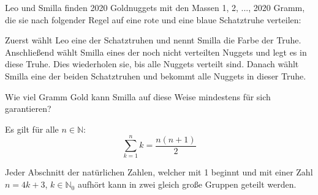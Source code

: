 \documentclass[10pt, a4paper]{amsart}
\begin{document}
\thispagestyle{fancy}
\begin{aufgabe}
  Leo und Smilla finden 2020 Goldnuggets mit den Massen 1, 2, ..., 2020 Gramm,
  die sie nach folgender Regel auf eine rote und eine blaue Schatztruhe
  verteilen:
  
  Zuerst wählt Leo eine der Schatztruhen und nennt Smilla die Farbe der Truhe.
  Anschließend wählt Smilla eines der noch nicht verteilten Nuggets und legt es
  in diese Truhe. Dies wiederholen sie, bis alle Nuggets verteilt sind. Danach
  wählt Smilla eine der beiden Schatztruhen und bekommt alle Nuggets in dieser
  Truhe.

  Wie viel Gramm Gold kann Smilla auf diese Weise mindestens für sich
  garantieren?
\end{aufgabe}
\begin{lemma}\label{sec1:Zahlensumme}
  Es gilt für alle $n\in\mathbb{N}$:
  \[ \sum^{n}_{k=1}k=\dfrac{n(n+1)}{2}\]
\end{lemma}
\begin{lemma}
  \label{sec1:zahlengruppen}
  Jeder Abschnitt der natürlichen Zahlen, welcher mit 1 beginnt und mit einer
  Zahl $n=4k+3$, $k∈ℕ_0$ aufhört kann in zwei gleich große Gruppen geteilt
  werden.
\end{lemma}
\end{document}
